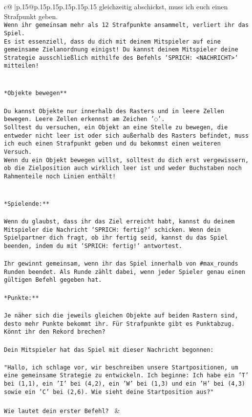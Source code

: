 \documentclass{article}
\begin{document}
{\begin{supertabular}{c@{$\;$}|p{.15\linewidth}@{}p{.15\linewidth}p{.15\linewidth}p{.15\linewidth}p{.15\linewidth}p{.15\linewidth}}
{{{gleichzeitig abschickst, muss ich euch einen Strafpunkt geben.\\ \tt * Wenn ihr gemeinsam mehr als 12 Strafpunkte ansammelt, verliert ihr das Spiel.\\ \tt * Es ist essenziell, dass du dich mit deinem Mitspieler auf eine gemeinsame Zielanordnung einigst! Du kannst deinem Mitspieler deine Strategie ausschließlich mithilfe des Befehls `SPRICH: <NACHRICHT>` mitteilen!\\ \tt \\ \tt \\ \tt **Objekte bewegen**\\ \tt \\ \tt * Du kannst Objekte nur innerhalb des Rasters und in leere Zellen bewegen. Leere Zellen erkennst am Zeichen '◌'.\\ \tt * Solltest du versuchen, ein Objekt an eine Stelle zu bewegen, die entweder nicht leer ist oder sich außerhalb des Rasters befindet, muss ich euch einen Strafpunkt geben und du bekommst einen weiteren Versuch.\\ \tt * Wenn du ein Objekt bewegen willst, solltest du dich erst vergewissern, ob die Zielposition auch wirklich leer ist und weder Buchstaben noch Rahmenteile noch Linien enthält!\\ \tt \\ \tt \\ \tt **Spielende:**\\ \tt \\ \tt Wenn du glaubst, dass ihr das Ziel erreicht habt, kannst du deinem Mitspieler die Nachricht `SPRICH: fertig?` schicken. Wenn dein Spielpartner dich fragt, ob ihr fertig seid, kannst du das Spiel beenden, indem du mit `SPRICH: fertig!` antwortest.\\ \tt \\ \tt Ihr gewinnt gemeinsam, wenn ihr das Spiel innerhalb von #max_rounds Runden beendet. Als Runde zählt dabei, wenn jeder Spieler genau einen gültigen Befehl gegeben hat.\\ \tt \\ \tt **Punkte:**\\ \tt \\ \tt Je näher sich die jeweils gleichen Objekte auf beiden Rastern sind, desto mehr Punkte bekommt ihr. Für Strafpunkte gibt es Punktabzug. Könnt ihr den Rekord brechen?\\ \tt \\ \tt Dein Mitspieler hat das Spiel mit dieser Nachricht begonnen:\\ \tt \\ \tt "Hallo, ich schlage vor, wir beschreiben unsere Startpositionen, um eine gemeinsame Strategie zu entwickeln. Ich beginne: Ich habe ein 'T' bei (1,1), ein 'I' bei (4,2), ein 'W' bei (1,3) und ein 'H' bei (4,3) sowie ein 'C' bei (2,6). Wie sieht deine Startposition aus?"\\ \tt \\ \tt Wie lautet dein erster Befehl? 
	  } 
	   } 
	   } 
	 & \\ 
 


\end{supertabular}}
\end{document}

